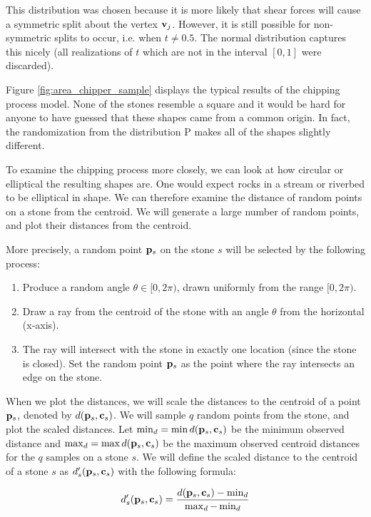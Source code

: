 This distribution was chosen because it is more likely that shear forces will cause a symmetric split about the vertex $\mathbf{v}_j$. However, it is still possible for non-symmetric splits to occur, i.e. when $t \neq 0.5$. The normal distribution captures this nicely (all realizations of $t$ which are not in the interval $[0,1]$ were discarded).

Figure \ref{fig:area_chipper_sample} displays the typical results of the chipping process model. None of the stones resemble a square and it would be hard for anyone to have guessed that these shapes came from a common origin. In fact, the randomization from the distribution $\mathrm{P}$ makes all of the shapes slightly different.

To examine the chipping process more closely, we can look at how circular or elliptical the resulting shapes are. One would expect rocks in a stream or riverbed to be elliptical in shape. We can therefore examine the distance of random points on a stone from the centroid. We will generate a large number of random points, and plot their distances from the centroid.

More precisely, a random point $\mathbf{p}_s$ on the stone $s$ will be selected by the following process:
\begin{enumerate}
  \item Produce a random angle $\theta \in [0, 2\pi)$, drawn uniformly from the range $[0, 2\pi)$.
  \item Draw a ray from the centroid of the stone with an angle $\theta$ from the horizontal (x-axis).
  \item The ray will intersect with the stone in exactly one location (since the stone is closed). Set the random point $\mathbf{p}_s$ as the point where the ray intersects an edge on the stone.
\end{enumerate}

When we plot the distances, we will scale the distances to the centroid of a point $\mathbf{p}_s$, denoted by $d(\mathbf{p}_s, \mathbf{c}_s)$. We will sample $q$ random points from the stone, and plot the scaled distances. Let $\min_d = \min d(\mathbf{p}_s, \mathbf{c}_s)$ be the minimum observed distance and $\max_d = \max d(\mathbf{p}_s, \mathbf{c}_s)$ be the maximum observed centroid distances for the $q$ samples on a stone $s$. We will define the scaled distance to the centroid of a stone $s$ as $d'_s(\mathbf{p}_s, \mathbf{c}_s)$ with the following formula:

\begin{eqnarray}
  d'_s(\mathbf{p}_s, \mathbf{c}_s) = \frac{d(\mathbf{p}_s, \mathbf{c}_s) - \min_d}{ \max_d - \min_d }
\end{eqnarray}

